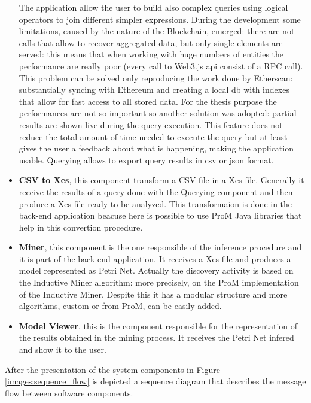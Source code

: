 \begin{itemize}
        The application allow the user to build also complex queries using logical operators to join different simpler expressions.
        During the development some limitations, caused by the nature of the Blockchain, emerged: there are not calls that allow 
        to recover aggregated data, but only single elements are served: this means that when working with huge numbers of entities 
        the performance are really poor (every call to Web3.js api consist of a RPC call). This problem can be solved only 
        reproducing the work done by Etherscan: substantially syncing with Ethereum and creating a local db with indexes that 
        allow for fast access to all stored data. For the thesis purpose the performances are not so important so another solution 
        was adopted: partial results are shown live during the query execution. This feature does not reduce the total amount of 
        time needed to execute the query but at least gives the user a feedback about what is happening, making the application 
        usable.
        Querying allows to export query results in csv or json format.
    
    \item \textbf{CSV to Xes}, this component transform a CSV file in a Xes file. Generally it receive the results of a query 
        done with the Querying component and then produce a Xes file ready to be analyzed. This transformaion is done in the back-end 
        application beacuse here is possible to use ProM Java libraries that help in this convertion procedure.

    \item \textbf{Miner}, this component is the one responsible of the inference procedure and it is part of the back-end 
        application. It receives a Xes file and produces a model represented as Petri Net. Actually the discovery activity is based on 
        the Inductive Miner algorithm: more precisely, on the ProM implementation of the Inductive Miner. Despite this it has a 
        modular structure and more algorithms, custom or from ProM, can be easily added.

    \item \textbf{Model Viewer}, this is the component responsible for the representation of the results obtained in the mining 
        process. It receives the Petri Net infered and show it to the user.

\end{itemize}

After the presentation of the system components in Figure \ref{images:sequence_flow} is depicted a sequence diagram that 
describes the message flow between software components.

